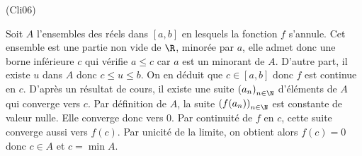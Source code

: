 \begin{tiny}(Cli06)\end{tiny} Soit $A$ l'ensembles des réels dans $[a,b]$ en lesquels la fonction $f$ s'annule. Cet ensemble est une partie non vide de $\R$, minorée par $a$, elle admet donc une borne inférieure $c$ qui vérifie $a\leq c$ car $a$ est un minorant de $A$.\newline
D'autre part, il existe $u$ dans $A$ donc $c\leq u \leq b$. On en déduit que $c\in [a,b]$ donc $f$ est continue en $c$.\newline
D'après un résultat de cours, il existe une suite $\left( a_n\right)_{n\in \N}$ d'éléments de $A$ qui converge vers $c$.\newline
Par définition de $A$, la suite $\left( f(a_n)\right)_{n\in \N}$ est constante de valeur nulle. Elle converge donc vers $0$.\newline
Par continuité de $f$ en $c$, cette suite converge aussi vers $f(c)$. Par unicité de la limite, on obtient alors $f(c)=0$ donc $c\in A$ et $c=\min A$.

